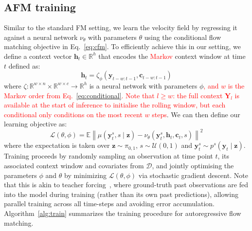 \documentclass[a4paper,10pt,twocolumn,preprint,3p]{elsarticle}
\begin{document}
\subsection{AFM training}
Similar to the standard FM setting, we learn the velocity field by regressing it against a neural network $\nu_\theta$ with parameters $\theta$ using the conditional flow matching objective in Eq.~\eqref{eq:cfm}. To efficiently achieve this in our setting, we define a context vector $\mathbf{h}_t \in \mathbb{R}^h$ that encodes the \textcolor{red}{Markov} context window at time $t$ defined as:
\begin{equation}\label{eq:seq_model}
\mathbf{h}_t = \zeta_\phi(\mathbf{y}_{t-w:t-1}, \mathbf{c}_{t-w:t-1})
\end{equation}
where $\zeta \colon \mathbb{R}^{w \times n} \times \mathbb{R}^{w \times c} \to  \mathbb{R}^h$ is a neural network with parameters $\phi$\textcolor{red}{, and $w$ is the Markov order from Eq.~\eqref{eq:conditional}. Note that $l \ge w$: the full context $\mathbf{Y}_l$ is available at the start of inference to initialise the rolling window, but each conditional only conditions on the most recent $w$ steps}. We can then define our learning objective as: 
\begin{equation}\label{eqn:cfm}
\mathcal{L}(\theta, \phi) = \mathbb{E} \left\| \mu(\mathbf{y}_t^s, s \mid \mathbf{z}) - \nu_\theta(\mathbf{y}_t^s, \mathbf{h}_t, \mathbf{c}_t, s) \right\|^2 
\end{equation}
where the expectation is taken over $\mathbf{z} \sim \pi_{0,1}$, $s \sim \mathcal{U}(0,1)$ and $\mathbf{y}_t^s \sim p^s(\mathbf{y}_t\mid\mathbf{z})$. Training proceeds by randomly sampling an observation at time point $t$, its associated context window and covariates from $\mathcal{D}$, and jointly optimising the parameters $\phi$ and $\theta$ by minimizing $\mathcal{L}(\theta, \phi)$ via stochastic gradient descent. 
Note that this is akin to teacher forcing~\citep{williams1989learning}, where ground-truth past observations are fed into the model during training (rather than its own past predictions), allowing parallel training across all time-steps and avoiding error accumulation. Algorithm~\ref{alg:train} summarizes the training procedure for autoregressive flow matching. 
\end{document}
